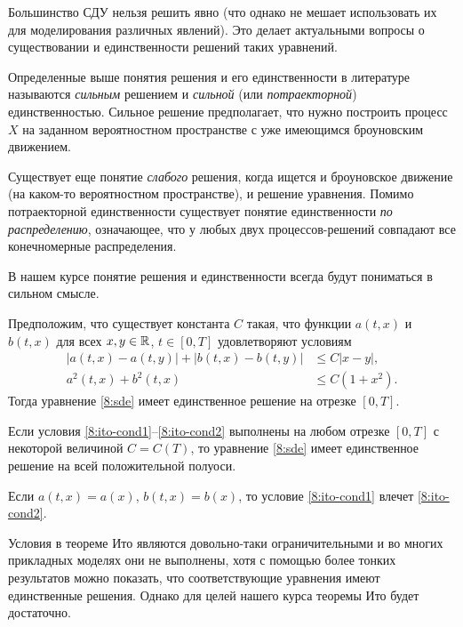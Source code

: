 \begin{remark}
Большинство СДУ нельзя решить явно (что однако не мешает использовать их для моделирования различных явлений).
Это делает актуальными вопросы о существовании и единственности решений таких уравнений.

Определенные выше понятия решения и его единственности в литературе называются \emph{сильным} решением и \emph{сильной} (или \emph{потраекторной}) единственностью.
Сильное решение предполагает, что нужно построить процесс $X$ на заданном вероятностном пространстве с уже имеющимся броуновским движением.

Существует еще понятие \emph{слабого} решения, когда ищется и броуновское движение (на каком-то вероятностном пространстве), и решение уравнения.
Помимо потраекторной единственности существует понятие единственности \emph{по распределению}, означающее, что у любых двух процессов-решений совпадают все конечномерные распределения.

В нашем курсе понятие решения и единственности всегда будут пониматься в сильном смысле.
\end{remark}



\begin{theorem}[Ито]
\label{8:t:ito-existence}
Предположим, что существует константа $C$ такая, что  функции $a(t,x)$ и $b(t,x)$ для всех $x,y\in\mathbb{R}$, $t\in[0,T]$ удовлетворяют условиям
\begin{align}
\label{8:ito-cond1}
|a(t,x) - a(t,y)| + |b(t,x) - b(t,y)| &\le C|x-y|,\\
\label{8:ito-cond2}
a^2(t,x) + b^2(t,x) &\le C(1+x^2).
\end{align}
Тогда уравнение \eqref{8:sde} имеет единственное решение на отрезке $[0,T]$.

Если условия \eqref{8:ito-cond1}--\eqref{8:ito-cond2} выполнены на любом отрезке $[0,T]$ с некоторой величиной $C=C(T)$, то уравнение \eqref{8:sde} имеет единственное решение на всей положительной полуоси.
\end{theorem}

\begin{remark}
Если $a(t,x) = a(x)$, $b(t,x) = b(x)$, то условие \eqref{8:ito-cond1} влечет \eqref{8:ito-cond2}.
\end{remark}

Условия в теореме Ито являются довольно-таки ограничительными и во многих прикладных моделях они не выполнены, хотя с помощью более тонких результатов можно показать, что соответствующие уравнения имеют единственные решения.
Однако для целей нашего курса теоремы Ито будет достаточно.

